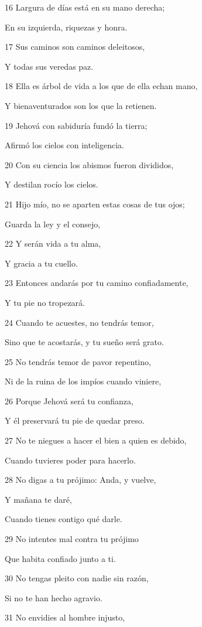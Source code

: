 \par 16 Largura de días está en su mano derecha;
\par En su izquierda, riquezas y honra.
\par 17 Sus caminos son caminos deleitosos,
\par Y todas sus veredas paz.
\par 18 Ella es árbol de vida a los que de ella echan mano,
\par Y bienaventurados son los que la retienen.
\par 19 Jehová con sabiduría fundó la tierra;
\par Afirmó los cielos con inteligencia.
\par 20 Con su ciencia los abismos fueron divididos,
\par Y destilan rocío los cielos.
\par 21 Hijo mío, no se aparten estas cosas de tus ojos;
\par Guarda la ley y el consejo,
\par 22 Y serán vida a tu alma,
\par Y gracia a tu cuello.
\par 23 Entonces andarás por tu camino confiadamente,
\par Y tu pie no tropezará.
\par 24 Cuando te acuestes, no tendrás temor,
\par Sino que te acostarás, y tu sueño será grato.
\par 25 No tendrás temor de pavor repentino,
\par Ni de la ruina de los impíos cuando viniere,
\par 26 Porque Jehová será tu confianza,
\par Y él preservará tu pie de quedar preso.
\par 27 No te niegues a hacer el bien a quien es debido,
\par Cuando tuvieres poder para hacerlo.
\par 28 No digas a tu prójimo: Anda, y vuelve,
\par Y mañana te daré,
\par Cuando tienes contigo qué darle.
\par 29 No intentes mal contra tu prójimo
\par Que habita confiado junto a ti.
\par 30 No tengas pleito con nadie sin razón,
\par Si no te han hecho agravio.
\par 31 No envidies al hombre injusto,
